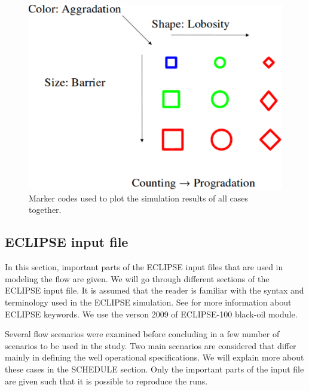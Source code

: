 \begin{figure}
  \centering
  \includegraphics[width=0.65 \linewidth]{./figurer/codes} 
  \caption{Marker codes used to plot the simulation results of all cases
together.}
  \label{fig:codes}
%
\end{figure}


\subsection{ECLIPSE input file}
\label{eclDataFile}

In this section, important parts of the ECLIPSE input files that are used in modeling the flow are given. We will go through different sections of the ECLIPSE input file. It is assumed that the reader is familiar with the syntax and terminology used in the ECLIPSE simulation. See \cite{sis2007eclipse} for more information about ECLIPSE keywords. We use the verson 2009 of ECLIPSE-100 black-oil module.

Several flow scenarios were examined before concluding in a few number of scenarios to be used in the study. Two main scenarios are considered that differ mainly in defining the well operational specifications. We will explain more about these cases in the SCHEDULE section. Only the important parts of the input file are given such that it is possible to reproduce the runs.

